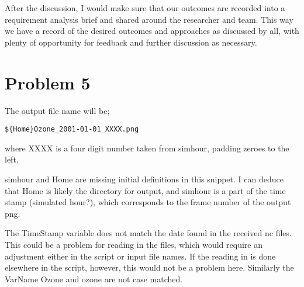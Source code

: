 \documentclass{article}
\begin{document}
After the discussion, I would make sure that our outcomes are recorded into a requirement analysis brief and shared around the researcher and team.
This way we have a record of the desired outcomes and approaches as discussed by all, with plenty of opportunity for feedback and further discussion as necessary.

\section*{Problem 5}

The output file name will be;

\begin{verbatim}${Home}Ozone_2001-01-01_XXXX.png\end{verbatim}

where XXXX is a four digit number taken from simhour, padding zeroes to the left.

simhour and Home are missing initial definitions in this snippet.
I can deduce that Home is likely the directory for output, and simhour is a part of the time stamp (simulated hour?), which corresponds to the frame number of the output png.

The TimeStamp variable does not match the date found in the received nc files.
This could be a problem for reading in the files, which would require an adjustment either in the script or input file names.
If the reading in is done elsewhere in the script, however, this would not be a problem here.
Similarly the VarName Ozone and ozone are not case matched.
\end{document}
